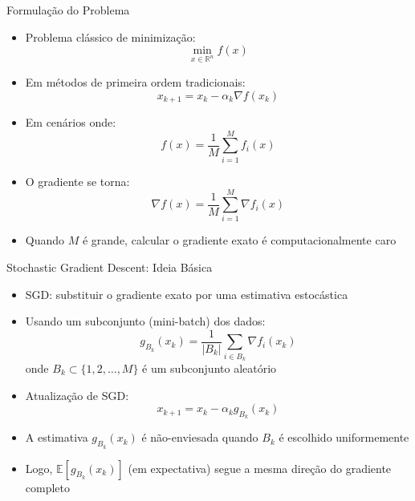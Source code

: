 \documentclass[aspectratio=1610]{beamer}
\newcommand{\R}{\mathbb{R}}
\begin{document}
\begin{frame}{Formulação do Problema}
\begin{itemize}
    \item Problema clássico de minimização: \pause
    \begin{equation*}
        \min_{x \in \R^n} f(x)
    \end{equation*} \pause
    \item Em métodos de primeira ordem tradicionais: \pause
    \begin{equation*}
        x_{k+1} = x_k - \alpha_k \nabla f(x_k)
    \end{equation*} \pause
    \item Em cenários onde: \pause
    \begin{equation*}
        f(x) = \frac{1}{M} \sum_{i=1}^{M} f_i(x)
    \end{equation*} \pause
    \item O gradiente se torna: \pause
    \begin{equation*}
        \nabla f(x) = \frac{1}{M} \sum_{i=1}^{M} \nabla f_i(x)
    \end{equation*} \pause
    \item Quando $M$ é grande, calcular o gradiente exato é computacionalmente caro
\end{itemize}
\end{frame}

\begin{frame}{Stochastic Gradient Descent: Ideia Básica}
\begin{itemize}
    \item SGD: substituir o gradiente exato por uma estimativa estocástica \pause
    \item Usando um subconjunto (mini-batch) dos dados: \pause
    \begin{equation*}
        g_{B_k}(x_k) = \frac{1}{|B_k|} \sum_{i \in B_k} \nabla f_i(x_k)
    \end{equation*}
    onde $B_k \subset \{1, 2, \ldots, M\}$ é um subconjunto aleatório \pause
    \item Atualização de SGD: \pause
    \begin{equation*}
        x_{k+1} = x_k - \alpha_k g_{B_k}(x_k)
    \end{equation*} \pause
    \item A estimativa $g_{B_k}(x_k)$ é não-enviesada quando $B_k$ é escolhido uniformemente \pause
    \item Logo, $\mathbb{E}[g_{B_k}(x_k)]$ (em expectativa) segue a mesma direção do gradiente completo
\end{itemize}
\end{frame}
\end{document}
